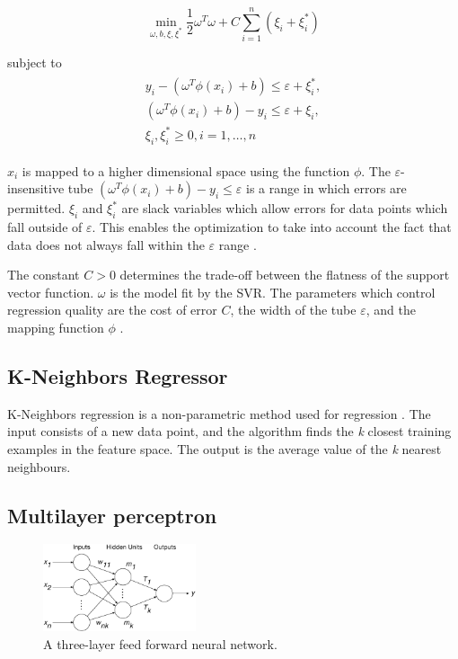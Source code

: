 \begin{equation}
\min_{\omega,b,\xi,\xi^{*}}\frac{1}{2}\omega^T\omega+C\sum_{i=1}^{n}(\xi_i+\xi_i^*)
\end{equation}

\noindent subject to
\begin{align}
\begin{multlined}
\label{svr:constrains}
y_i-(\omega^T\phi(x_i)+b)\leq\varepsilon+\xi_i^{*},\\
(\omega^T\phi(x_i)+b)-y_i\leq\varepsilon+\xi_i,\\
\xi_i,\xi^*_i\geq0,i=1,\ldots,n
\end{multlined}
\end{align}

\noindent $x_i$ is mapped to a higher dimensional space using the function $\phi$. The $\varepsilon$-insensitive tube $(\omega^T\phi(x_i)+b)-y_i\leq\varepsilon$ is a range in which errors are permitted. $\xi_i$ and $\xi^*_i$ are slack variables which allow errors for data points which fall outside of $\varepsilon$. This enables the optimization to take into account the fact that data does not always fall within the $\varepsilon$ range \cite{Smola2004}.

The constant $C>0$ determines the trade-off between the flatness of the support vector function. $\omega$ is the model fit by the SVR. The parameters which control regression quality are the cost of error $C$, the width of the tube $\varepsilon$, and the mapping function $\phi$ \cite{Shu2006,Chen2004}. 


\subsection{K-Neighbors Regressor}

K-Neighbors regression is a non-parametric method used for regression \cite{forgy65}. The input consists of a new data point, and the algorithm finds the \textit{k} closest training examples in the feature space. The output is the average value of the \textit{k} nearest neighbours.



\subsection{Multilayer perceptron}


\begin{figure}
\centering
    \includegraphics[width=0.4\textwidth]{Chapter5/figures/market-forecasting/methods/Kell_eEnergy_Fig1.eps}
    \caption{A three-layer feed forward neural network.}
    \label{fig:mlp}
\end{figure}

